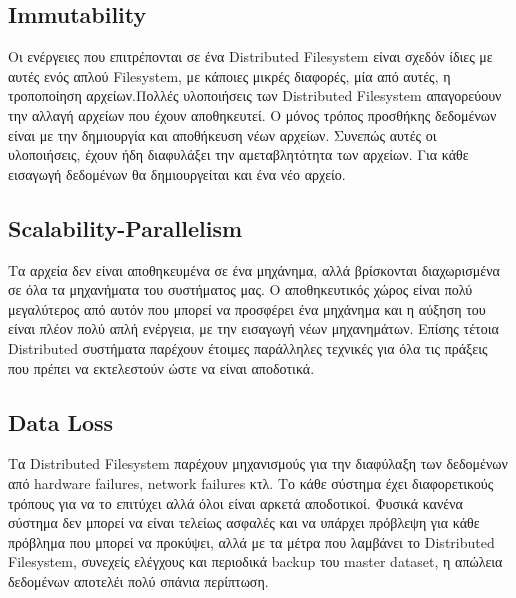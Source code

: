 \subsection{Immutability}
Οι ενέργειες που επιτρέπονται σε ένα Distributed Filesystem είναι σχεδόν ίδιες με αυτές ενός απλού Filesystem, με κάποιες μικρές διαφορές, μία από αυτές, η τροποποίηση αρχείων.Πολλές υλοποιήσεις των Distributed Filesystem απαγορεύουν την αλλαγή αρχείων που έχουν αποθηκευτεί. Ο μόνος τρόπος προσθήκης δεδομένων είναι με την δημιουργία και αποθήκευση νέων αρχείων. Συνεπώς αυτές οι υλοποιήσεις, έχουν ήδη διαφυλάξει την αμεταβλητότητα των αρχείων. Για κάθε εισαγωγή δεδομένων θα δημιουργείται και ένα νέο αρχείο.
\subsection{Scalability-Parallelism}
Τα αρχεία δεν είναι αποθηκευμένα σε ένα μηχάνημα, αλλά βρίσκονται διαχωρισμένα σε όλα τα μηχανήματα του συστήματος μας. Ο αποθηκευτικός χώρος είναι πολύ μεγαλύτερος από αυτόν που μπορεί να προσφέρει ένα μηχάνημα και η αύξηση του είναι πλέον πολύ απλή ενέργεια, με την εισαγωγή νέων μηχανημάτων. Επίσης τέτοια Distributed συστήματα παρέχουν έτοιμες παράλληλες τεχνικές για όλα τις πράξεις που πρέπει να εκτελεστούν ώστε να είναι αποδοτικά.
\subsection{Data Loss}
Τα Distributed Filesystem παρέχουν μηχανισμούς για την διαφύλαξη των δεδομένων από hardware failures, network failures κτλ. Το κάθε σύστημα έχει διαφορετικούς τρόπους για να το επιτύχει αλλά όλοι είναι αρκετά αποδοτικοί. Φυσικά κανένα σύστημα δεν μπορεί να είναι τελείως ασφαλές και να υπάρχει πρόβλεψη για κάθε πρόβλημα που μπορεί να προκύψει, αλλά με τα μέτρα που λαμβάνει το Distributed Filesystem, συνεχείς ελέγχους και περιοδικά backup του master dataset, η απώλεια δεδομένων αποτελέι πολύ σπάνια περίπτωση.
